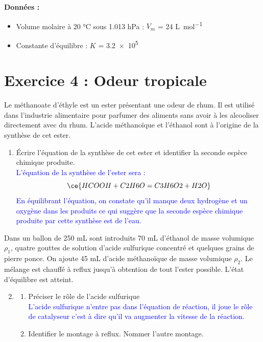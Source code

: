 \documentclass[a4paper,11pt,fleqn]{article}%
\begin{document}
\textbf{Données :}\\
\begin{itemize}
	\item Volume molaire à \num{20} \unit{\celsius} sous \num{1,013} \unit{\hecto \pascal} : $V_m$ = \num{24} \unit{\liter \per \mole}
	\item Constante d'équilibre : $K$ = \num{3,2e5}
\end{itemize}

\section*{Exercice 4 : Odeur tropicale}
Le méthanoate d'éthyle  est un ester présentant une odeur de rhum. Il est utilisé dans l'industrie alimentaire pour parfumer des aliments sans avoir à les alcooliser directement avec du rhum. L'acide méthanoïque  et l'éthanol  sont à l'origine de la synthèse de cet ester.
\begin{enumerate}
	\item Écrire l'équation de la synthèse de cet ester et identifier la seconde espèce chimique produite.\\
	\textcolor{blue}{L'équation de la synthèse de l'ester sera : $$ \ce{ HCOOH + C2H6O = C3H6O2 + H2O}$$ 
	En équilibrant l'équation, on constate qu'il manque deux hydrogène et un oxygène dans les produits ce qui suggère que la seconde espèce chimique produite par cette synthèse est de l'eau.}
\end{enumerate}
Dans un ballon de \num{250} \unit{\milli \liter} sont introduits \num{70} \unit{\milli \liter} d'éthanol de masse volumique $\rho_1$, quatre gouttes de solution d'acide sulfurique concentré  et quelques grains de pierre ponce. On ajoute \num{45} \unit{\milli \liter} d'acide méthanoïque de masse volumique $\rho_2$. Le mélange est chauffé à reflux jusqu'à obtention de tout l'ester possible. L'état d'équilibre est atteint.
\begin{enumerate}
\setcounter{enumi}{1}
	\item \begin{enumerate}
			\item Préciser le rôle de l'acide sulfurique\\
			\textcolor{blue}{L'acide sulfurique n'entre pas dans l'équation de réaction, il joue le rôle de catalyseur c'est à dire qu'il va augmenter la vitesse de la réaction.}
			\item Identifier le montage à reflux. Nommer l'autre montage.
	\end{enumerate}
\end{enumerate}
\end{document}
